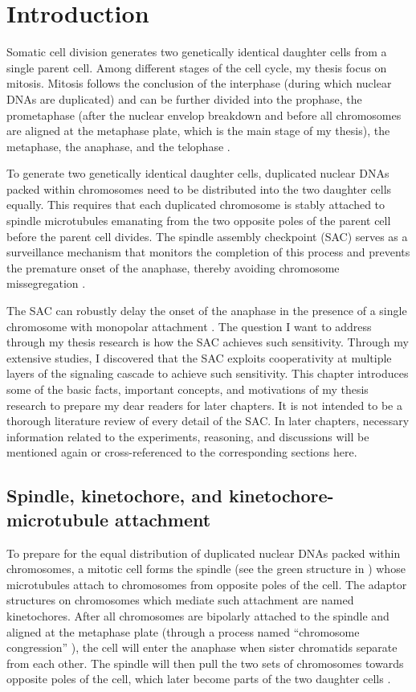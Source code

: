 \chapter{Introduction}
\label{chpt:introduction}

Somatic cell division generates two genetically identical daughter cells from a single parent cell. Among different stages of the cell cycle, my thesis focus on mitosis. Mitosis follows the conclusion of the interphase (during which nuclear DNAs are duplicated) and can be further divided into the prophase, the prometaphase (after the nuclear envelop breakdown and before all chromosomes are aligned at the metaphase plate, which is the main stage of my thesis), the metaphase, the anaphase, and the telophase \cite{MBC4}.

To generate two genetically identical daughter cells, duplicated nuclear DNAs packed within chromosomes need to be distributed into the two daughter cells equally. This requires that each duplicated chromosome is stably attached to spindle microtubules emanating from the two opposite poles of the parent cell before the parent cell divides. The spindle assembly checkpoint (SAC) serves as a surveillance mechanism that monitors the completion of this process and prevents the premature onset of the anaphase, thereby avoiding chromosome missegregation \cite{MBC4}.

The SAC can robustly delay the onset of the anaphase in the presence of a single chromosome with monopolar attachment \cite{PtK1SingleUnattachedKT}. The question I want to address through my thesis research is how the SAC achieves such sensitivity. Through my extensive studies, I discovered that the SAC exploits cooperativity at multiple layers of the signaling cascade to achieve such sensitivity. This chapter introduces some of the basic facts, important concepts, and motivations of my thesis research to prepare my dear readers for later chapters. It is not intended to be a thorough literature review of every detail of the SAC. In later chapters, necessary information related to the experiments, reasoning, and discussions will be mentioned again or cross-referenced to the corresponding sections here.

\section{Spindle, kinetochore, and kinetochore-microtubule attachment}

To prepare for the equal distribution of duplicated nuclear DNAs packed within chromosomes, a mitotic cell forms the spindle (see the green structure in ) whose microtubules attach to chromosomes from opposite poles of the cell. The adaptor structures on chromosomes which mediate such attachment are named kinetochores. After all chromosomes are bipolarly attached to the spindle and aligned at the metaphase plate (through a process named ``chromosome congression'' \cite{ChromosomeCongression}), the cell will enter the anaphase when sister chromatids separate from each other. The spindle will then pull the two sets of chromosomes towards opposite poles of the cell, which later become parts of the two daughter cells \cite{MBC4}.

